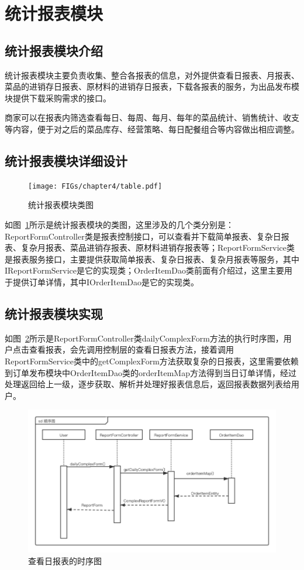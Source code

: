\section{统计报表模块}
\subsection{统计报表模块介绍}
统计报表模块主要负责收集、整合各报表的信息，对外提供查看日报表、月报表、菜品的进销存日报表、原材料的进销存日报表，下载各报表的服务，为出品发布模块提供下载采购需求的接口。

商家可以在报表内筛选查看每日、每周、每月、每年的菜品统计、销售统计、收支等内容，便于对之后的菜品库存、经营策略、每日配餐组合等内容做出相应调整。\\

\subsection{统计报表模块详细设计}
\begin{figure}[htbp!]
    \centering
    \texttt{[image: FIGs/chapter4/table.pdf]}
    \caption{统计报表模块类图}\label{fig_table}
\end{figure}

如图~\ref{fig_table}所示是统计报表模块的类图，这里涉及的几个类分别是：ReportFormController类是报表控制接口，可以查看并下载简单报表、复杂日报表、复杂月报表、菜品进销存报表、原材料进销存报表等；ReportFormService类是报表服务接口，主要提供获取简单报表、复杂日报表、复杂月报表等服务，其中IReportFormService是它的实现类；OrderItemDao类前面有介绍过，这里主要用于提供订单详情，其中IOrderItemDao是它的实现类。\\

\subsection{统计报表模块实现}
如图~\ref{fig_table_time}所示是ReportFormController类dailyComplexForm方法的执行时序图，用户点击查看报表，会先调用控制层的查看日报表方法，接着调用ReportFormService类中的getComplexForm方法获取复杂的日报表，这里需要依赖到订单发布模块中OrderItemDao类的orderItemMap方法得到当日订单详情，经过处理返回给上一级，逐步获取、解析并处理好报表信息后，返回报表数据列表给用户。

\begin{figure}[htbp!]
    \centering
    \includegraphics[width=\linewidth]{FIGs/chapter4/table_time.pdf}
    \caption{查看日报表的时序图}\label{fig_table_time}
\end{figure}

